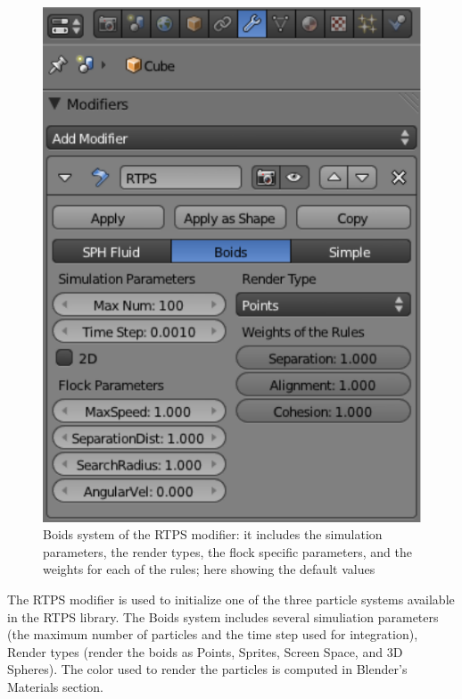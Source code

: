 \begin{figure}[htbp]
\begin{center}
\includegraphics[scale=0.8]{figures/modifier.pdf}
\caption{Boids system of the RTPS modifier: it includes the simulation parameters, the render types, the flock specific parameters, and the weights for each of the rules; here showing the default values}
\label{ui}
\end{center}
\end{figure}

The RTPS modifier is used to initialize one of the three particle systems available in the RTPS library. The Boids system includes several simuliation parameters (the maximum number of particles and the time step used for integration), Render types (render the boids as Points, Sprites, Screen Space, and 3D Spheres). The color used to render the particles is computed  in Blender's Materials section.

